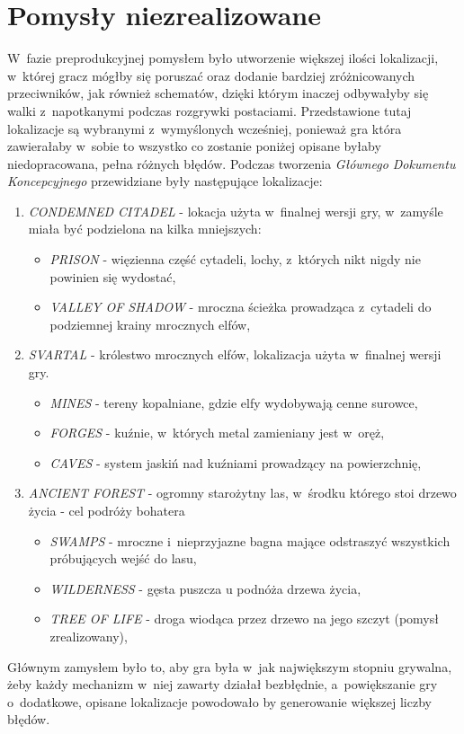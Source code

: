 \documentclass[12pt,a4paper,oneside]{book}
\theoremstyle{definition}
\numberwithin{equation}{chapter}
\begin{document}
\section{Pomysły niezrealizowane}
\par W~fazie preprodukcyjnej pomysłem było utworzenie większej ilości lokalizacji, w~której gracz mógłby się poruszać oraz dodanie bardziej zróżnicowanych przeciwników, jak również schematów, dzięki którym inaczej odbywałyby się walki z~napotkanymi podczas rozgrywki postaciami. Przedstawione tutaj lokalizacje są wybranymi z~wymyślonych wcześniej, ponieważ gra która zawierałaby w~sobie to wszystko co zostanie poniżej opisane byłaby niedopracowana, pełna różnych błędów. Podczas tworzenia \textit{Głównego Dokumentu Koncepcyjnego} przewidziane były następujące lokalizacje:
\begin{enumerate}
    \item \textit{CONDEMNED CITADEL} - lokacja użyta w~finalnej wersji gry, w~zamyśle miała być podzielona na kilka mniejszych:
    \begin{itemize}
        \item \textit{PRISON} - więzienna część cytadeli, lochy, z~których nikt nigdy nie powinien się wydostać,
        \item \textit{VALLEY OF SHADOW} - mroczna ścieżka prowadząca z~cytadeli do podziemnej krainy mrocznych elfów,
    \end{itemize}
    \item \textit{SVARTAL} - królestwo mrocznych elfów, lokalizacja użyta w~finalnej wersji gry.
        \begin{itemize}
            \item \textit{MINES} - tereny kopalniane, gdzie elfy wydobywają cenne surowce, 
            \item \textit{FORGES} - kuźnie, w~których metal zamieniany jest w~oręż,
            \item \textit{CAVES} - system jaskiń nad kuźniami prowadzący na powierzchnię,
        \end{itemize}
    \item \textit{ANCIENT FOREST} - ogromny starożytny las, w~środku którego stoi drzewo życia - cel podróży bohatera
        \begin{itemize}
            \item \textit{SWAMPS} - mroczne i~nieprzyjazne bagna mające odstraszyć wszystkich próbujących wejść do lasu,
            \item \textit{WILDERNESS} - gęsta puszcza u podnóża drzewa życia,
            \item \textit{TREE OF LIFE} - droga wiodąca przez drzewo na jego szczyt (pomysł zrealizowany),
        \end{itemize}
\end{enumerate}
\par Głównym zamysłem było to, aby gra była w~jak największym stopniu grywalna, żeby każdy mechanizm w~niej zawarty działał bezbłędnie, a~powiększanie gry o~dodatkowe, opisane lokalizacje powodowało by generowanie większej liczby błędów.
\end{document}
